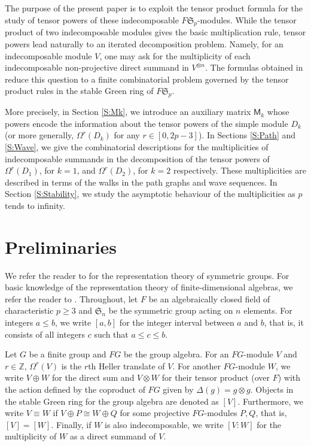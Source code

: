 \documentclass[12pt,reqno]{amsart}
\newcommand{\Z}{\mathbb{Z}}
\newcommand{\sym}[1]{\mathfrak{S}_{#1}}
\newcommand{\F}{{F}}
\renewcommand{\geq}{\geqslant}
\renewcommand{\leq}{\leqslant}
\newcommand{\M}{\mathsf{M}}
\theoremstyle{definition}
\numberwithin{equation}{section}
\begin{document}
The purpose of the present paper is to exploit the tensor product formula for the study of tensor powers of these indecomposable $\F\sym{p}$-modules. While the tensor product of two indecomposable modules gives the basic multiplication rule, tensor powers lead naturally to an iterated decomposition problem. Namely, for an indecomposable module $V$, one may ask for the multiplicity of each indecomposable non-projective direct summand in
$V^{\otimes n}$. The formulas obtained in \cite{kualim1} reduce this question to a finite combinatorial problem governed by the tensor product rules in the stable Green ring of $\F\sym{p}$. 

More precisely, in Section \ref{S:Mk}, we introduce an auxiliary matrix $\M_k$ whose powers encode the information about the tensor powers of the simple module $D_k$ (or more generally, $\Omega^r(D_k)$ for any $r\in [0,2p-3]$). In Sections \ref{S:Path} and \ref{S:Wave}, we give the combinatorial descriptions for the multiplicities of indecomposable summands in the decomposition of the tensor powers of $\Omega^r(D_1)$, for $k=1$, and $\Omega^r(D_2)$, for $k=2$ respectively. These multiplicities are described in terms of the walks in the path graphs and wave sequences. In Section \ref{S:Stability}, we study the asymptotic behaviour of the multiplicities as $p$ tends to infinity.  



\section{Preliminaries} 

We refer the reader to \cite{james,jk} for the representation theory of symmetric groups. For basic knowledge of the representation theory of finite-dimensional algebras, we refer the reader to \cite{alp,ben1}. Throughout, let $\F$ be an algebraically closed field of characteristic $p\geq 3$ and $\sym{n}$ be the symmetric group acting on $n$ elements. For integers $a\leq b$, we write $[a,b]$ for the integer interval between $a$ and $b$, that is, it consists of all integers $c$ such that $a\leq c\leq b$. 

Let $G$ be a finite group and $\F G$ be the group algebra. For an $\F G$-module $V$ and $r\in\Z$, $\Omega^r(V)$ is the $r$th Heller translate of $V$. For another $\F G$-module $W$, we write $V\oplus W$ for the direct sum and $V\otimes W$ for their tensor product (over $\F$) with the action defined by the coproduct of $\F G$ given by $\Delta(g)=g\otimes g$. Objects in the stable Green ring for the group algebra are denoted as $[V]$. Furthermore, we write $V\equiv W$ if $V\oplus P\cong W\oplus Q$ for some projective $\F G$-modules $P,Q$, that is, $[V]=[W]$. Finally, if $W$ is also indecomposable, we write $[V:W]$ for the multiplicity of $W$ as a direct summand of $V$. 
\end{document}
